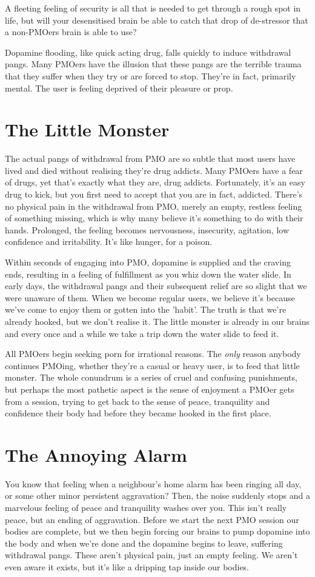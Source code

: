 \documentclass[easypeasy.tex]{subfiles}
\begin{document}
A fleeting feeling of security is all that is needed to get through a rough spot in life, but will your desensitised brain be able to catch that drop of de-stressor that a non-PMOers brain is able to use?

Dopamine flooding, like quick acting drug, falls quickly to induce withdrawal pangs. Many PMOers have the illusion that these pangs are the terrible trauma that they suffer when they try or are forced to stop. They're in fact, primarily mental. The user is feeling deprived of their pleasure or prop.

\section{The Little Monster}
The actual pangs of withdrawal from PMO are so subtle that most users have lived and died without realising they're drug addicts. Many PMOers have a fear of drugs, yet that's exactly what they are, drug addicts. Fortunately, it's an easy drug to kick, but you first need to accept that you are in fact, addicted. There's no physical pain in the withdrawal from PMO, merely an empty, restless feeling of something missing, which is why many believe it's something to do with their hands. Prolonged, the feeling becomes nervousness, insecurity, agitation, low confidence and irritability. It's like hunger, for a poison.

Within seconds of engaging into PMO, dopamine is supplied and the craving ends, resulting in a feeling of fulfillment as you whiz down the water slide. In early days, the withdrawal pangs and their subsequent relief are so slight that we were unaware of them. When we become regular users, we believe it's because we've come to enjoy them or gotten into the 'habit'. The truth is that we're already hooked, but we don't realise it. The little monster is already in our brains and every once and a while we take a trip down the water slide to feed it.

All PMOers begin seeking porn for irrational reasons. The \textit{only} reason anybody continues PMOing, whether they're a casual or heavy user, is to feed that little monster. The whole conundrum is a series of cruel and confusing punishments, but perhaps the most pathetic aspect is the sense of enjoyment a PMOer gets from a session, trying to get back to the sense of peace, tranquility and confidence their body had before they became hooked in the first place.

\section{The Annoying Alarm}
You know that feeling when a neighbour's home alarm has been ringing all day, or some other minor persistent aggravation? Then, the noise suddenly stops and a marvelous feeling of peace and tranquility washes over you. This isn't really peace, but an ending of aggravation. Before we start the next PMO session our bodies are complete, but we then begin forcing our brains to pump dopamine into the body and when we're done and the dopamine begins to leave, suffering withdrawal pangs. These aren't physical pain, just an empty feeling. We aren't even aware it exists, but it's like a dripping tap inside our bodies.
\end{document}
